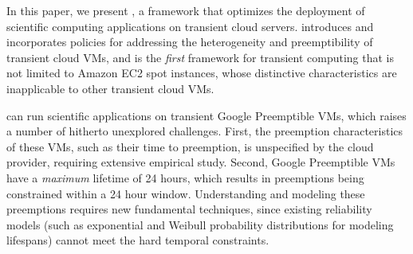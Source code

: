 

%




In this paper, we present \sysname, a framework that optimizes the deployment of scientific computing applications on transient cloud servers. 
%
\sysname introduces and incorporates policies for addressing the heterogeneity and preemptibility of transient cloud VMs, and is the \emph{first} framework for transient computing  that is not limited to Amazon EC2 spot instances, whose distinctive characteristics are inapplicable to other transient cloud VMs.




%

\sysname can run scientific applications on transient Google Preemptible VMs, which raises a number of hitherto unexplored challenges. 
First, the preemption characteristics of these VMs, such as their time to preemption, is unspecified by the cloud provider, requiring extensive empirical study. 
Second, Google Preemptible VMs have a \emph{maximum} lifetime of 24 hours, which results in preemptions being constrained within a 24 hour window.
Understanding and modeling these preemptions requires new fundamental techniques, since existing reliability models (such as exponential and Weibull probability distributions for modeling lifespans) cannot meet the hard temporal constraints. 

